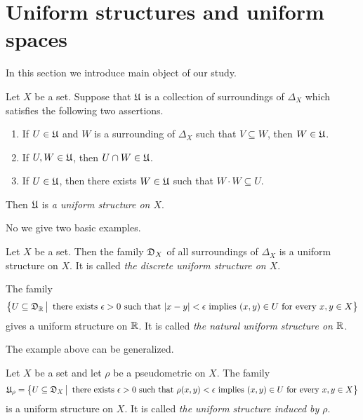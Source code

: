 \section{Uniform structures and uniform spaces}
\noindent
In this section we introduce main object of our study.

\begin{definition}
Let $X$ be a set. Suppose that ${\mathfrak U}$ is a collection of surroundings of $\Delta_X$ which satisfies the following two assertions.
\begin{enumerate}[label=\textbf{(\arabic*)}, leftmargin=*]
\item If $U \in {\mathfrak U}$ and $W$ is a surrounding of $\Delta_X$ such that $V\subseteq W$, then $W\in {\mathfrak U}$.
\item If $U,W\in {\mathfrak U}$, then $U\cap W \in {\mathfrak U}$. 
\item If $U \in {\mathfrak U}$, then there exists $W\in {\mathfrak U}$ such that $W\cdot W \subseteq U$.
\end{enumerate}
Then ${\mathfrak U}$ is \textit{a uniform structure on $X$}.
\end{definition}
\noindent
No we give two basic examples.

\begin{example}\label{example:discrete_uniform_structure}
Let $X$ be a set. Then the family ${\mathfrak D}_X$ of all surroundings of $\Delta_X$ is a uniform structure on $X$. It is called \textit{the discrete uniform structure on $X$}.
\end{example}

\begin{example}\label{example:uniform_structure_on_reals}
The family
$$\big\{U\subseteq {\mathfrak D}_{{\mathbb R}}\,\big|\,\mbox{ there exists }\epsilon > 0\mbox{ such that }|x - y| < \epsilon\mbox{ implies }(x,y)\in U\mbox{ for every }x,y\in X\big\}$$
gives a uniform structure on ${\mathbb R}$. It is called \textit{the natural uniform structure on ${\mathbb R}$}.
\end{example}
\noindent
The example above can be generalized.

\begin{example}\label{example:uniform_structure_induced_by_pseudometric}
Let $X$ be a set and let $\rho$ be a pseudometric on $X$. The family
$${\mathfrak U}_{\rho} = \big\{U\subseteq {\mathfrak D}_{X}\,\big|\,\mbox{ there exists }\epsilon > 0\mbox{ such that }\rho(x,y) < \epsilon\mbox{ implies }(x,y)\in U\mbox{ for every }x,y\in X\big\}$$
is a uniform structure on $X$. It is called \textit{the uniform structure induced by $\rho$}.
\end{example}
    
